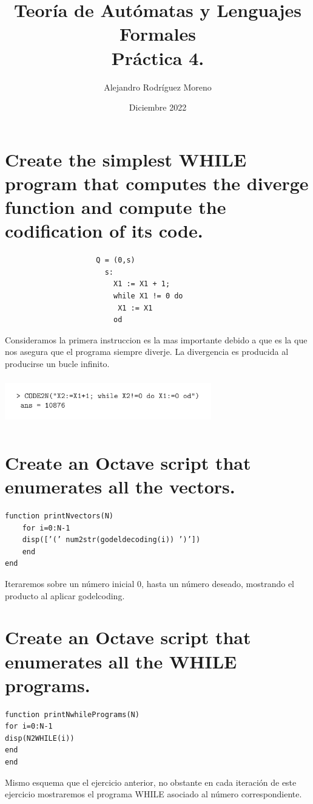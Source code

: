 \documentclass{article}
\title{Teoría de Autómatas y Lenguajes Formales\\[.4\baselineskip]Práctica 4.}
\author{Alejandro Rodríguez Moreno }
\date{Diciembre 2022}
\theoremstyle{plain}
\theoremstyle{definition}
\begin{document}
\maketitle

\section{Create the simplest WHILE program that computes the diverge function and compute the codification of its code. }

\begin{verbatim}
                     Q = (0,s)
                       s:
                         X1 := X1 + 1;
                         while X1 != 0 do
                          X1 := X1
                         od
\end{verbatim}
Consideramos la primera instruccion es la mas importante debido a que es la que nos asegura que el programa siempre diverje. La divergencia es producida al producirse un bucle infinito. 

\begin{center}
\includegraphics[width=9cm, height=2cm]{P4_E1.png}
\end{center}
\newpage

\section {Create an Octave script that enumerates all the vectors.}
\begin{verbatim}
function printNvectors(N)
    for i=0:N-1
    disp([’(’ num2str(godeldecoding(i)) ’)’])
    end
end
\end{verbatim}
Iteraremos sobre un número inicial 0, hasta un número deseado, mostrando el producto al aplicar godelcoding.


\section {Create an Octave script that enumerates all the WHILE programs.}
\begin{verbatim}
function printNwhilePrograms(N)
for i=0:N-1
disp(N2WHILE(i))
end
end
\end{verbatim}
Mismo esquema que el ejercicio anterior, no obstante en cada iteración de este ejercicio mostraremos el programa WHILE asociado al número correspondiente.
\end{document}
